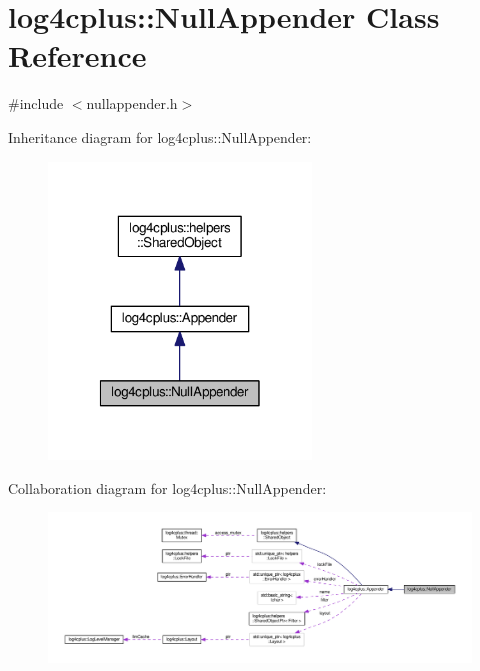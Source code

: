 \hypertarget{classlog4cplus_1_1NullAppender}{\section{log4cplus\-:\-:Null\-Appender Class Reference}
\label{classlog4cplus_1_1NullAppender}
}


{\ttfamily \#include $<$nullappender.\-h$>$}



Inheritance diagram for log4cplus\-:\-:Null\-Appender\-:
\nopagebreak
\begin{figure}[H]
\begin{center}
\leavevmode
\includegraphics[width=198pt]{classlog4cplus_1_1NullAppender__inherit__graph}
\end{center}
\end{figure}


Collaboration diagram for log4cplus\-:\-:Null\-Appender\-:
\nopagebreak
\begin{figure}[H]
\begin{center}
\leavevmode
\includegraphics[width=350pt]{classlog4cplus_1_1NullAppender__coll__graph}
\end{center}
\end{figure}
